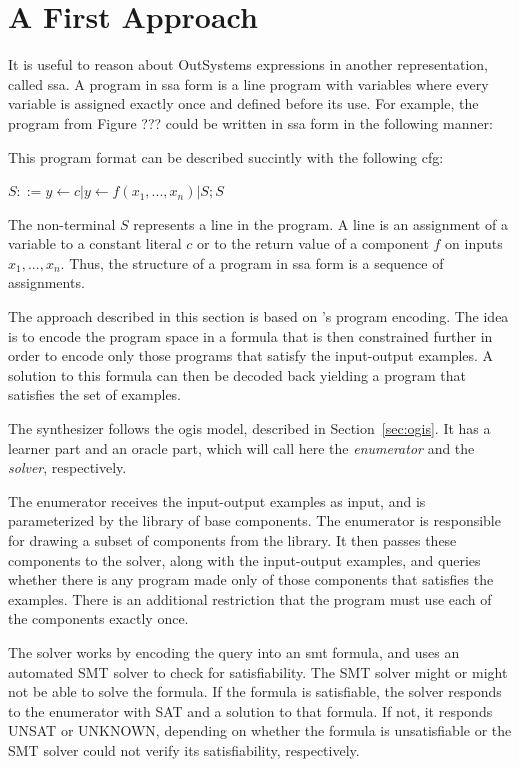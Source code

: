 \section{A First Approach}
\label{sec:first-approach}

It is useful to reason about OutSystems expressions in another representation,
called \gls{ssa}. A program in \gls{ssa} form is a line program with variables
where every variable is assigned exactly once and defined before its use. For
example, the program from Figure ??? could be written in \gls{ssa} form in the
following manner:


This program format can be described succintly with the following \gls{cfg}:

$S ::= y \leftarrow c | y \leftarrow f(x_1, ..., x_n) | S;S$

The non-terminal $S$ represents a line in the program. A line is an assignment
of a variable to a constant literal $c$ or to the return value of a component
$f$ on inputs $x_1, ..., x_n$. Thus, the structure of a program in \gls{ssa}
form is a sequence of assignments.

The approach described in this section is based on
\citeauthor{Jha:oracle:2010}'s program encoding. The idea is to encode the
program space in a formula that is then constrained further in order to encode
only those programs that satisfy the input-output examples. A solution to this
formula can then be decoded back yielding a program that satisfies the set of
examples.

The synthesizer follows the \gls{ogis} model, described in
Section~\ref{sec:ogis}. It has a learner part and an oracle part, which will
call here the \textit{enumerator} and the \textit{solver}, respectively.

The enumerator receives the input-output examples as input, and is parameterized
by the library of base components. The enumerator is responsible for drawing a
subset of components from the library. It then passes these components to the
solver, along with the input-output examples, and queries whether there is any
program made only of those components that satisfies the examples. There is an
additional restriction that the program must use each of the components exactly
once.


The solver works by encoding the query into an \gls{smt} formula, and uses an
automated SMT solver to check for satisfiability. The SMT solver might or might
not be able to solve the formula. If the formula is satisfiable, the solver
responds to the enumerator with SAT and a solution to that formula. If not, it
responds UNSAT or UNKNOWN, depending on whether the formula is unsatisfiable or
the SMT solver could not verify its satisfiability, respectively.


